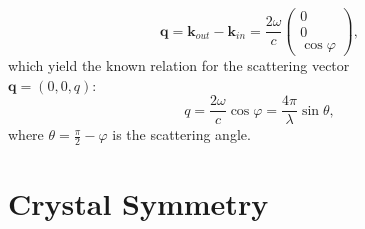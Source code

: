\documentclass[twocolumn,amsmath,superscriptaddress,amssymb]{revtex4-1}
\renewcommand{\thefigure}{Fig.\arabic{figure}}
\renewcommand{\theequation}{Eq.\arabic{equation}}
\let\vec\mathbf
\begin{document}
\begin{equation}
\vec{q}=\vec{k}_{out}-\vec{k}_{in}=\frac{2\omega}{c}\left(
\begin{array}{c}
0\\0\\ \cos \varphi
\end{array}\right),
\end{equation}
\noindent which yield the known relation for the scattering vector \\$\vec{q} = \left(0,0,q\right)$:
\begin{equation}\label{eq: ScatAngle}
q=\frac{2\omega}{c}\cos \varphi=\frac{4\pi}{\lambda}\sin \theta,
\end{equation}
\noindent where $\theta=\frac{\pi}{2}-\varphi$ is the scattering angle.
\section{Crystal Symmetry}
\renewcommand{\thefigure}{Fig.C\arabic{figure}}
\renewcommand{\theequation}{Eq.C\arabic{equation}}
\end{document}
